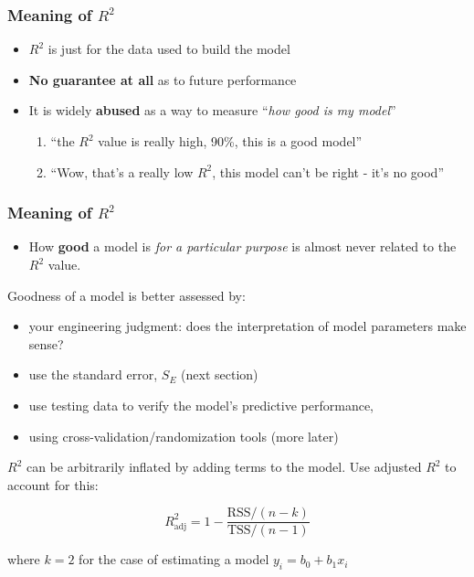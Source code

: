 \begin{frame}\frametitle{Meaning of $R^2$}
	\begin{itemize}
		\item	$R^2$ is just for the data used to build the model
		\item	\textbf{No guarantee at all} as to future performance
		\item	It is widely \textbf{abused} as a way to measure ``\emph{how good is my model}''
		\begin{enumerate}
			\item	``the $R^2$ value is really high, 90\%, this is a good model''
			\item	``Wow, that's a really low $R^2$, this model can't be right - it's no good''
		\end{enumerate}
	\end{itemize}
\end{frame}

\begin{frame}\frametitle{Meaning of $R^2$}
	\begin{itemize}
		\item	How \textbf{good} a model is \emph{for a particular purpose} is almost never related to the $R^2$ value.
	\end{itemize}

	Goodness of a model is better assessed by:
	\begin{itemize}
		\item	your engineering judgment: does the interpretation of model parameters make sense?
		\item	use the standard error, $S_E$ (next section)
		\item	use testing data to verify the model's predictive performance,
		\item	using cross-validation/randomization tools (more later)
	\end{itemize}

	$R^2$ can be arbitrarily inflated by adding terms to the model. Use adjusted $R^2$ to account for this:

	$$ R^2_\text{adj} = 1 - \dfrac{\text{RSS}/(n-k)}{\text{TSS}/(n-1)} $$

	where $k=2$ for the case of estimating a model $y_i = b_0 + b_1 x_i$
\end{frame}

